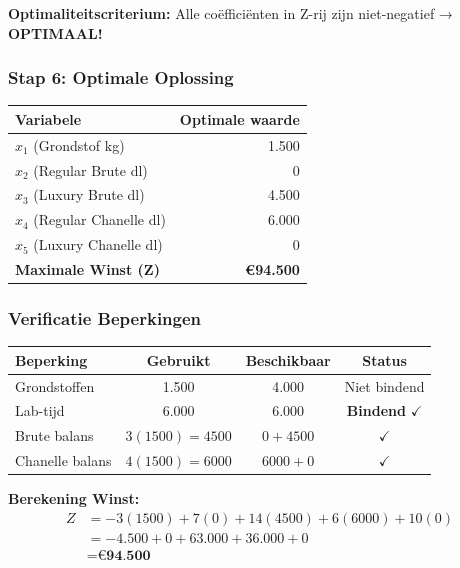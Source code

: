 \documentclass[a4paper,11pt]{article}
\begin{document}
\begin{oefenblok}[title=Lineair Programmeren — Rylon Parfums]
\textbf{Optimaliteitscriterium:} Alle coëfficiënten in Z-rij zijn niet-negatief → \textbf{OPTIMAAL!}

\subsubsection*{Stap 6: Optimale Oplossing}

\begin{center}
\begin{tabular}{|l|r|}
\hline
\textbf{Variabele} & \textbf{Optimale waarde} \\
\hline
$x_1$ (Grondstof kg) & 1.500 \\
\hline
$x_2$ (Regular Brute dl) & 0 \\
\hline
$x_3$ (Luxury Brute dl) & 4.500 \\
\hline
$x_4$ (Regular Chanelle dl) & 6.000 \\
\hline
$x_5$ (Luxury Chanelle dl) & 0 \\
\hline
\hline
\textbf{Maximale Winst (Z)} & \textbf{€94.500} \\
\hline
\end{tabular}
\end{center}

\subsubsection*{Verificatie Beperkingen}

\begin{center}
\begin{tabular}{|l|c|c|c|}
\hline
\textbf{Beperking} & \textbf{Gebruikt} & \textbf{Beschikbaar} & \textbf{Status} \\
\hline
Grondstoffen & 1.500 & 4.000 & Niet bindend \\
\hline
Lab-tijd & 6.000 & 6.000 & \textbf{Bindend} $\checkmark$ \\
\hline
Brute balans & $3(1500) = 4500$ & $0 + 4500$ & $\checkmark$ \\
\hline
Chanelle balans & $4(1500) = 6000$ & $6000 + 0$ & $\checkmark$ \\
\hline
\end{tabular}
\end{center}

\textbf{Berekening Winst:}
\begin{align*}
Z &= -3(1500) + 7(0) + 14(4500) + 6(6000) + 10(0) \\
&= -4.500 + 0 + 63.000 + 36.000 + 0 \\
&= \textbf{€94.500}
\end{align*}


\end{oefenblok}
\end{document}
